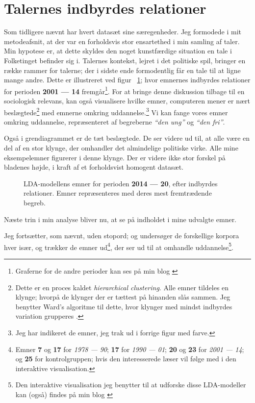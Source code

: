 \section{Talernes indbyrdes relationer}
Som tidligere nævnt har hvert datasæt sine særegenheder.
Jeg formodede i mit metodeafsnit, at der var en forholdsvis stor ensartethed i min samling af taler.
Min hypotese er, at dette skyldes den noget kunstfærdige situation en tale i Folketinget befinder sig i.
Talernes kontekst, lejret i det politiske spil, bringer en række rammer for talerne; der i sidste ende formodentlig får en tale til at ligne mange andre.
Dette er illustreret ved figur ~\ref{fig:dendro_all};
hvor emnernes indbyrdes relationer for perioden \textbf{2001 --- 14} fremgår\footnote{
Graferne for de andre perioder kan ses på min blog \autocite{andersenSelectedAssignmentsAarhus2020}}.
For at bringe denne diskussion tilbage til en sociologisk relevans, kan også visualisere hvilke emner, computeren mener er nært beslægtede\footnote{Dette er en proces kaldet \textit{hierarchical clustering}. Alle emner tildeles en klynge; hvorpå de klynger der er tættest på hinanden slås sammen. Jeg benytter Ward's algoritme til dette, hvor klynger med mindst indbyrdes variation grupperes \autocite{wardHierarchicalGroupingOptimize1963}.} med emnerne omkring uddannelse.\footnote{Jeg har indikeret de emner, jeg trak ud i forrige figur med farve.}
Vi kan fange vores emner omkring uddannelse, repræsenteret af begreberne \textit{“den ung”} og \textit{“den fri”}.

Også i grendiagrammet er de tæt beslægtede.
De ser videre ud til, at alle være en del af en stor klynge, der omhandler det almindelige politiske virke.
Alle mine eksempelemner figurerer i denne klynge.
Der er videre ikke stor forskel på bladenes højde, i kraft af et forholdsvist homogent datasæt. 

\begin{figure}
 
 \caption{LDA-modellens emner for perioden \textbf{2014 --- 20}, efter indbyrdes relationer. Emner repræsenteres med deres mest fremtrædende begreb.}
\label{fig:dendro_all}
\end{figure}

Næste trin i min analyse bliver nu, at se på indholdet i mine udvalgte emner.

Jeg fortsætter, som nævnt, uden stopord; og undersøger de forskellige korpora hver især, og trækker de emner ud\footnote{Emner \textbf{7} og \textbf{17} for \textit{1978 --- 90}; \textbf{17} for \textit{1990 --- 01}; \textbf{20} og \textbf{23} for \textit{2001 --- 14}; og \textbf{25} for kontrolgruppen; hvis den interesserede læser vil følge med i den interaktive visualisation.}, der ser ud til at omhandle uddannelse\footnote{Den interaktive visualisation jeg benytter til at udforske disse LDA-modeller kan (også) findes på min blog \autocite{andersenSelectedAssignmentsAarhus2020}}.

